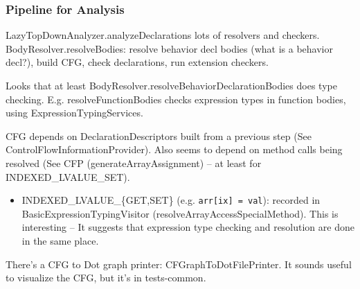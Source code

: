 \documentclass{article}
\begin{document}
\subsubsection{Pipeline for Analysis}

LazyTopDownAnalyzer.analyzeDeclarations \textSafeTo lots of resolvers and checkers.
BodyResolver.resolveBodies: resolve behavior decl bodies (what is a behavior decl?), build CFG, check declarations, run extension checkers.

Looks that at least BodyResolver.resolveBehaviorDeclarationBodies does type checking. E.g. resolveFunctionBodies checks expression types in function bodies, using ExpressionTypingServices.

CFG depends on DeclarationDescriptors built from a previous step (See ControlFlowInformationProvider). Also seems to depend on method calls being resolved (See CFP (generateArrayAssignment) -- at least for INDEXED\_LVALUE\_SET).

\begin{itemize}
    \item INDEXED\_LVALUE\_\{GET,SET\} (e.g. \texttt{arr[ix] = val}): recorded in BasicExpressionTypingVisitor (resolveArrayAccessSpecialMethod). This is interesting -- It suggests that expression type checking and resolution are done in the same place.
\end{itemize}

There's a CFG to Dot graph printer: CFGraphToDotFilePrinter. It sounds useful to visualize the CFG, but it's in tests-common.


\newpage
\printnomenclature
\end{document}

